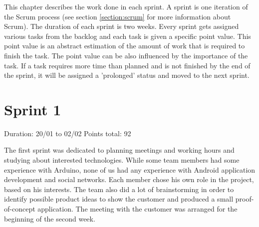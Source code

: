 
This chapter describes the work done in each sprint. A sprint is one iteration of the Scrum process
(see section \ref{section:scrum} for more information about Scrum). The duration of each sprint is two weeks.
Every sprint gets assigned various tasks from the backlog and each task is given a specific point value.
This point value is an abstract estimation of the amount of work that is required to finish the task.
The point value can be also influenced by the importance of the task. If a task requires more time than
planned and is not finished by the end of the sprint, it will be assigned a 'prolonged' status and
moved to the next sprint.

\newpage

\section{Sprint 1}

Duration: 20/01 to 02/02
Points total: 92

The first sprint was dedicated to planning meetings and working hours
and studying about interested technologies. While some team members had some
experience with Arduino, none of us had any experience with Android application
development and social networks. Each member chose his own role in the project,
based on his interests. The team also did a lot of brainstorming in order
to identify possible product ideas to show the customer and produced a small
proof-of-concept application. The meeting with the customer was arranged for
the beginning of the second week.

